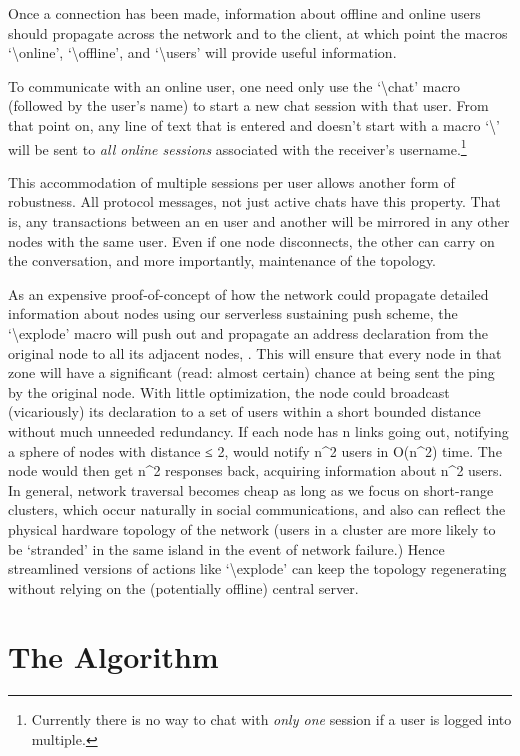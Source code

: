 \documentclass[11pt]{article}
\begin{document}
Once a connection has been made, information about offline and online users should propagate across the network and to the client, at which point the macros `\textbackslash online', `\textbackslash offline', and `\textbackslash users' will provide useful information.

To communicate with an online user, one need only use the `\textbackslash chat' macro (followed by the user's name) to start a new chat session with that user. From that point on, any line of text that is entered and doesn't start with a macro `\textbackslash' will be sent to \emph{all online sessions} associated with the receiver's username.\footnote{Currently there is no way to chat with \emph{only one} session if a user is logged into multiple.}

This accommodation of multiple sessions per user allows another form of robustness. All protocol messages, not just active chats have this property. That is, any transactions between an en user and another will be mirrored in any other nodes with the same user. Even if one node disconnects, the other can carry on the conversation, and more importantly, maintenance of the topology.

As an expensive proof-of-concept of how the network could propagate detailed information about nodes using our serverless sustaining push scheme, the `\textbackslash explode' macro will push out and propagate an address declaration from the original node to all its adjacent nodes, . This will ensure that every node in that zone will have a significant (read: almost certain) chance at being sent the ping by the original node. With little optimization, the node could broadcast (vicariously) its declaration to a set of users within a short bounded distance without much unneeded redundancy. If each node has n links going out, notifying a sphere of nodes with distance ≤ 2, would notify n^2 users in O(n^2) time. The node would then get n^2 responses back, acquiring information about n^2 users. In general, network traversal becomes cheap as long as we focus on short-range clusters, which occur naturally in social communications, and also can reflect the physical hardware topology of the network (users in a cluster are more likely to be `stranded' in the same island in the event of network failure.) Hence streamlined versions of actions like `\textbackslash explode' can keep the topology regenerating without relying on the (potentially offline) central server.

\section{The Algorithm}
\end{document}
